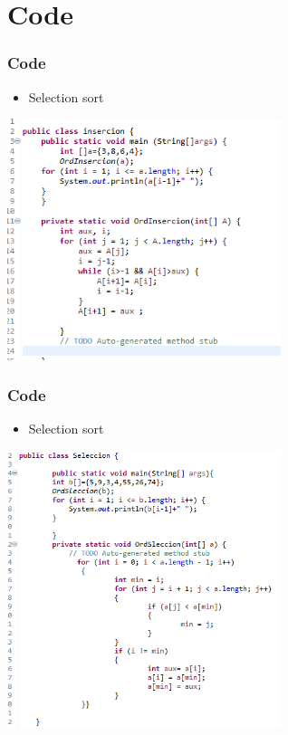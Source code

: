 \documentclass[11pt]{beamer}
\begin{document}
\section{Code }
\begin{frame}
\frametitle{Code}
\begin{itemize}
\item Selection sort
\end{itemize}
\begin{center}
\includegraphics[width=8.0cm]{img/insercion (2).png}
\end{center}
\end{frame}

\begin{frame}
\frametitle{Code}
\begin{itemize}
\item Selection sort
\end{itemize}
\begin{center}
\includegraphics[width=8.0cm]{img/seleccion (2).png}
\end{center}
\end{frame}
\end{document}
